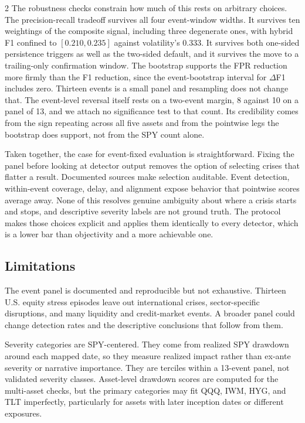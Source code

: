 \documentclass{book}
\begin{document}
\begin{multicols}{2}
The robustness checks constrain how much of this rests on arbitrary choices. The precision-recall tradeoff survives all four event-window widths. It survives ten weightings of the composite signal, including three degenerate ones, with hybrid F1 confined to $[0.210,0.235]$ against volatility's 0.333. It survives both one-sided persistence triggers as well as the two-sided default, and it survives the move to a trailing-only confirmation window. The bootstrap supports the FPR reduction more firmly than the F1 reduction, since the event-bootstrap interval for $\Delta$F1 includes zero. Thirteen events is a small panel and resampling does not change that. The event-level reversal itself rests on a two-event margin, 8 against 10 on a panel of 13, and we attach no significance test to that count. Its credibility comes from the sign repeating across all five assets and from the pointwise legs the bootstrap does support, not from the SPY count alone.

Taken together, the case for event-fixed evaluation is straightforward. Fixing the panel before looking at detector output removes the option of selecting crises that flatter a result. Documented sources make selection auditable. Event detection, within-event coverage, delay, and alignment expose behavior that pointwise scores average away. None of this resolves genuine ambiguity about where a crisis starts and stops, and descriptive severity labels are not ground truth. The protocol makes those choices explicit and applies them identically to every detector, which is a lower bar than objectivity and a more achievable one.

\subsection{Limitations}
The event panel is documented and reproducible but not exhaustive. Thirteen U.S. equity stress episodes leave out international crises, sector-specific disruptions, and many liquidity and credit-market events. A broader panel could change detection rates and the descriptive conclusions that follow from them.

Severity categories are SPY-centered. They come from realized SPY drawdown around each mapped date, so they measure realized impact rather than ex-ante severity or narrative importance. They are terciles within a 13-event panel, not validated severity classes. Asset-level drawdown scores are computed for the multi-asset checks, but the primary categories may fit QQQ, IWM, HYG, and TLT imperfectly, particularly for assets with later inception dates or different exposures.


\end{multicols}
\end{document}
